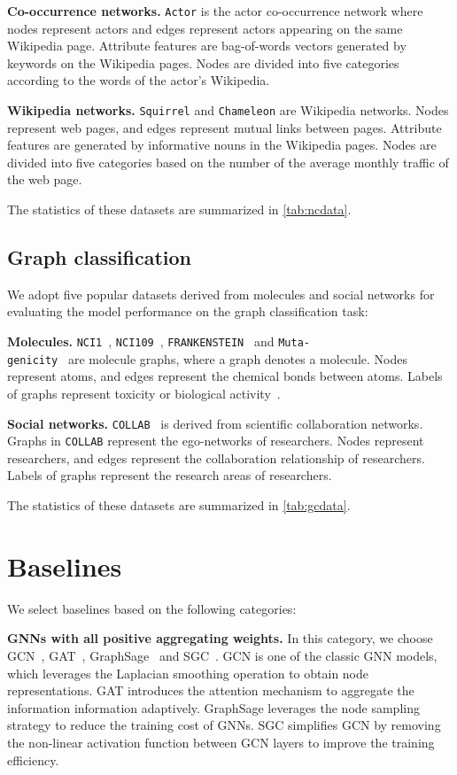 \documentclass[sigconf, screen]{acmart}
\begin{document}
\textbf{Co-occurrence networks.}
\texttt{Actor} is the actor co-occurrence network where nodes represent actors and edges represent actors appearing on the same Wikipedia page.
Attribute features are bag-of-words vectors generated by keywords on the Wikipedia pages.
Nodes are divided into five categories according to the words of the actor’s Wikipedia.

\textbf{Wikipedia networks.}
\texttt{Squirrel} and \texttt{Chameleon} are Wikipedia networks.
Nodes represent web pages, and edges represent mutual links between pages.
Attribute features are generated by informative nouns in the
Wikipedia pages. 
Nodes are divided into five categories based on the number of the average
monthly traffic of the web page.

The statistics of these datasets are summarized in \autoref{tab:ncdata}.


\subsection{Graph classification}
We adopt five popular datasets derived from molecules and social networks for evaluating the model performance on the graph classification task:

\textbf{Molecules.}
\texttt{NCI1}~\cite{nci}, \texttt{NCI109}~\cite{nci}, \texttt{FRANKENSTEIN}~\cite{frank} and \texttt{Muta-\\genicity}~\cite{mutag} are molecule graphs, where a graph denotes a molecule.
Nodes represent atoms, and edges represent the chemical bonds between atoms.
Labels of graphs represent toxicity or biological activity~\cite{tudataset}.

\textbf{Social networks.}
\texttt{COLLAB}~\cite{collab} is derived from scientific collaboration networks.
Graphs in \texttt{COLLAB} represent the ego-networks of researchers.
Nodes represent researchers, and edges represent the collaboration relationship of researchers.
Labels of graphs represent the research areas of researchers.

The statistics of these datasets are summarized in \autoref{tab:gcdata}.



\section{Baselines}\label{app_baselines}
We select baselines based on the following categories:

\textbf{GNNs with all positive aggregating weights.}
In this category, we choose GCN~\cite{gcn}, GAT~\cite{gat}, GraphSage~\cite{graphsage} and SGC~\cite{sgc}.
GCN is one of the classic GNN models, which leverages the Laplacian smoothing operation to obtain node representations.
GAT introduces the attention mechanism to aggregate the information information adaptively.
GraphSage leverages the node sampling strategy to reduce the training cost of GNNs.
SGC simplifies GCN by removing the non-linear activation function between GCN layers to improve the training efficiency. 
\end{document}
